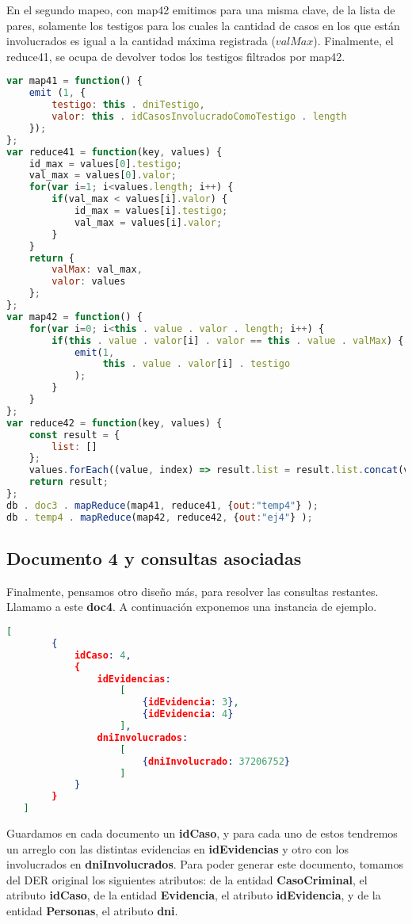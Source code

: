 \documentclass[11pt, a4paper]{article}
\begin{document}
En el segundo mapeo, con map42 emitimos para una misma clave, de la lista de pares, solamente los testigos para los cuales la cantidad de casos en los que están involucrados es igual a la cantidad máxima registrada ($valMax$). Finalmente, el reduce41, se ocupa de devolver todos los testigos filtrados por map42. 

\begin{lstlisting}[language=JavaScript]
var map41 = function() {
    emit (1, {
        testigo: this . dniTestigo, 
        valor: this . idCasosInvolucradoComoTestigo . length
    });
};
var reduce41 = function(key, values) {
    id_max = values[0].testigo;
    val_max = values[0].valor;
    for(var i=1; i<values.length; i++) {
        if(val_max < values[i].valor) {
            id_max = values[i].testigo;
            val_max = values[i].valor;
        }
    }
    return {
        valMax: val_max,
        valor: values
    };
};
var map42 = function() {
    for(var i=0; i<this . value . valor . length; i++) {
        if(this . value . valor[i] . valor == this . value . valMax) {  
            emit(1, 
                 this . value . valor[i] . testigo
            );
        }
    }
};
var reduce42 = function(key, values) {
    const result = {
        list: []
    };
    values.forEach((value, index) => result.list = result.list.concat(value));
    return result;
};
db . doc3 . mapReduce(map41, reduce41, {out:"temp4"} );
db . temp4 . mapReduce(map42, reduce42, {out:"ej4"} );
\end{lstlisting}
\subsection{Documento 4 y consultas asociadas}

Finalmente, pensamos otro diseño más, para resolver las consultas restantes. Llamamo a este \textbf{doc4}. A continuación exponemos una instancia de ejemplo.

\begin{lstlisting}[language=json]
   [
   		{
   			idCaso: 4,
	   		{
	   			idEvidencias: 
	   				[	
	   					{idEvidencia: 3},
	   					{idEvidencia: 4}
	   				],
	   			dniInvolucrados:
	   				[
	   					{dniInvolucrado: 37206752}
	   				]
	   		}
	   	}
   ]
\end{lstlisting}

Guardamos en cada documento un \textbf{idCaso}, y para cada uno de estos tendremos un arreglo con las distintas evidencias en \textbf{idEvidencias} y otro con los involucrados en \textbf{dniInvolucrados}. Para poder generar este documento, tomamos del DER original los siguientes atributos: de la entidad \textbf{CasoCriminal}, el atributo \textbf{idCaso}, de la entidad \textbf{Evidencia}, el atributo \textbf{idEvidencia}, y de la entidad \textbf{Personas}, el atributo \textbf{dni}. \
\end{document}
